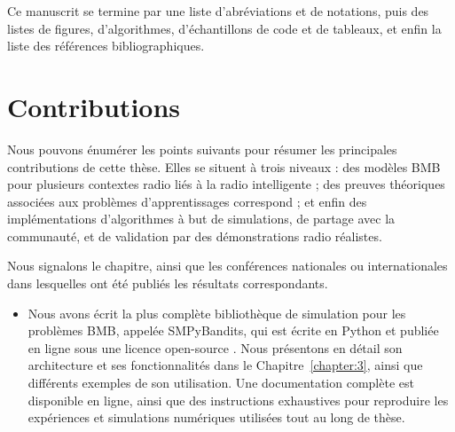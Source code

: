 \begin{resume_fr}
%
Ce manuscrit se termine par
une liste d'abréviations et de notations, puis des listes de figures, d'algorithmes, d'échantillons de code et de tableaux,
et enfin la liste des références bibliographiques.




\section*{Contributions}

Nous pouvons énumérer les points suivants pour résumer les principales contributions de cette thèse.
Elles se situent à trois niveaux : des modèles BMB pour plusieurs contextes radio liés à la radio intelligente ; des preuves théoriques associées aux problèmes d'apprentissages correspond ; et enfin des implémentations d'algorithmes à but de simulations, de partage avec la communauté, et de validation par des démonstrations radio réalistes.

Nous signalons le chapitre, ainsi que les conférences nationales ou internationales dans lesquelles ont été publiés les résultats correspondants.

\begin{itemize}


    \item
    Nous avons écrit la plus complète bibliothèque de simulation pour les problèmes BMB, appelée SMPyBandits, qui est écrite en Python et publiée en ligne sous une licence open-source \cite{SMPyBanditsJMLR,SMPyBandits}.
    Nous présentons en détail son architecture et ses fonctionnalités dans le Chapitre~\ref{chapter:3}, ainsi que différents exemples de son utilisation.
    Une documentation complète est disponible en ligne, ainsi que des instructions exhaustives pour reproduire les expériences et simulations numériques utilisées tout au long de thèse.


\end{itemize}
\end{resume_fr}
